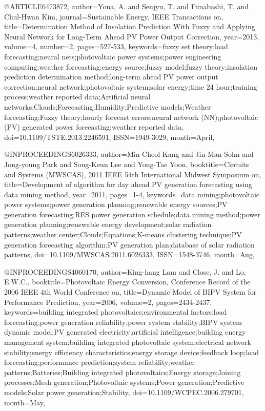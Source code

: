 @ARTICLE{6473872, 
author={Yona, A. and Senjyu, T. and Funabashi, T. and Chul-Hwan Kim}, 
journal={Sustainable Energy, IEEE Transactions on}, 
title={Determination Method of Insolation Prediction With Fuzzy and Applying Neural Network for Long-Term Ahead PV Power Output Correction}, 
year={2013}, 
volume={4}, 
number={2}, 
pages={527-533}, 
keywords={fuzzy set theory;load forecasting;neural nets;photovoltaic power systems;power engineering computing;weather forecasting;energy source;fuzzy model;fuzzy theory;insolation prediction determination method;long-term ahead PV power output correction;neural network;photovoltaic system;solar energy;time 24 hour;training process;weather reported data;Artificial neural networks;Clouds;Forecasting;Humidity;Predictive models;Weather forecasting;Fuzzy theory;hourly forecast errors;neural network (NN);photovoltaic (PV) generated power forecasting;weather reported data}, 
doi={10.1109/TSTE.2013.2246591}, 
ISSN={1949-3029}, 
month={April},}

@INPROCEEDINGS{6026333, 
author={Min-Cheol Kang and Jin-Man Sohn and Jong-young Park and Song-Keun Lee and Yong-Tae Yoon}, 
booktitle={Circuits and Systems (MWSCAS), 2011 IEEE 54th International Midwest Symposium on}, 
title={Development of algorithm for day ahead PV generation forecasting using data mining method}, 
year={2011}, 
pages={1-4}, 
keywords={data mining;photovoltaic power systems;power generation planning;renewable energy sources;PV generation forecasting;RES power generation schedule;data mining method;power generation planning;renewable energy development;solar radiation patterns;weather center;Clouds;Equations;K-means clustering technique;PV generation forecasting algorithm;PV generation plan;database of solar radiation patterns}, 
doi={10.1109/MWSCAS.2011.6026333}, 
ISSN={1548-3746}, 
month={Aug},}

@INPROCEEDINGS{4060170, 
author={King-hang Lam and Close, J. and Lo, E.W.C.}, 
booktitle={Photovoltaic Energy Conversion, Conference Record of the 2006 IEEE 4th World Conference on}, 
title={Dynamic Model of BIPV System for Performance Prediction}, 
year={2006}, 
volume={2}, 
pages={2434-2437}, 
keywords={building integrated photovoltaics;environmental factors;load forecasting;power generation reliability;power system stability;BIPV system dynamic model;PV generated electricity;artificial intelligence;building energy management system;building integrated photovoltaic system;electrical network stability;energy efficiency characteristics;energy storage device;feedback loop;load forecasting;performance prediction;system reliability;weather patterns;Batteries;Building integrated photovoltaics;Energy storage;Joining processes;Mesh generation;Photovoltaic systems;Power generation;Predictive models;Solar power generation;Stability}, 
doi={10.1109/WCPEC.2006.279701}, 
month={May},}

